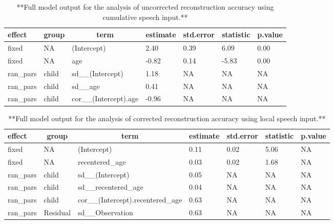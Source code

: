 \documentclass[man,mask,floatsintext]{apa6}
\begin{document}
\begin{table}[tbp]
\begin{center}
\begin{threeparttable}
\caption{\label{tab:tab-uncorr_reconstr_acc-cumu-MAIN}**Full model output for the analysis of uncorrected reconstruction accuracy using cumulative speech input.**}
\begin{tabular}{lllllll}
\toprule
effect & \multicolumn{1}{c}{group} & \multicolumn{1}{c}{term} & \multicolumn{1}{c}{estimate} & \multicolumn{1}{c}{std.error} & \multicolumn{1}{c}{statistic} & \multicolumn{1}{c}{p.value}\\
\midrule
fixed & NA & (Intercept) & 2.40 & 0.39 & 6.09 & 0.00\\
fixed & NA & age & -0.82 & 0.14 & -5.83 & 0.00\\
ran\_pars & child & sd\_\_(Intercept) & 1.18 & NA & NA & NA\\
ran\_pars & child & sd\_\_age & 0.41 & NA & NA & NA\\
ran\_pars & child & cor\_\_(Intercept).age & -0.96 & NA & NA & NA\\
\bottomrule
\end{tabular}
\end{threeparttable}
\end{center}
\end{table}

\begin{table}[tbp]
\begin{center}
\begin{threeparttable}
\caption{\label{tab:tab-corr_reconstr_acc-local-MAIN}**Full model output for the analysis of corrected reconstruction accuracy using local speech input.**}
\begin{tabular}{lllllll}
\toprule
effect & \multicolumn{1}{c}{group} & \multicolumn{1}{c}{term} & \multicolumn{1}{c}{estimate} & \multicolumn{1}{c}{std.error} & \multicolumn{1}{c}{statistic} & \multicolumn{1}{c}{p.value}\\
\midrule
fixed & NA & (Intercept) & 0.11 & 0.02 & 5.06 & NA\\
fixed & NA & recentered\_age & 0.03 & 0.02 & 1.68 & NA\\
ran\_pars & child & sd\_\_(Intercept) & 0.05 & NA & NA & NA\\
ran\_pars & child & sd\_\_recentered\_age & 0.04 & NA & NA & NA\\
ran\_pars & child & cor\_\_(Intercept).recentered\_age & 0.63 & NA & NA & NA\\
ran\_pars & Residual & sd\_\_Observation & 0.63 & NA & NA & NA\\
\bottomrule
\end{tabular}
\end{threeparttable}
\end{center}
\end{table}
\end{document}
